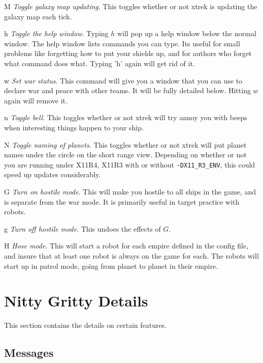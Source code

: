 \begin{list}{}{
	\renewcommand{\makelabel}[1]{{\tt #1 \hfill}}
         \setlength{\leftmargin}{.5in}
         \setlength{\labelwidth}{\leftmargin}
         \setlength{\labelsep}{0in}
}
\item[M]{\em Toggle galaxy map updating}.
This toggles whether or not xtrek is updating the galaxy map each tick.

\item[h]{\em Toggle the help window}.
Typing $h$ will pop up a help window below the normal window.  The help
window lists commands you can type.  Its useful for small problems
like forgetting how to put your shields up, and for authors who forget
what command does what.  Typing 'h' again will get rid of it.

\item[w]{\em Set war status}.
This command will give you a window that you can use to declare
war and peace with other teams.  It will be fully detailed below.
Hitting $w$ again will remove it.

\item[n]{\em Toggle bell}.
This toggles whether or not xtrek will try annoy you with beeps when
interesting things happen to your ship.

\item[N]{\em Toggle naming of planets}.
This toggles whether or not xtrek will put planet names under the circle
on the short range view. Depending on whether or not you are running
under X11R4, X11R3 with or without \verb|-DX11_R3_ENV|, this could speed
up updates considerably.

\item[G]{\em Turn on hostile mode}.
This will make you hostile to all ships in the game, and is separate from
the war mode. It is primarily useful in target practice with robots.

\item[g]{\em Turn off hostile mode}.
This undoes the effects of $G$.

\item [H]{\em Hose mode}.
This will start a robot for each empire defined in the config file, and insure
that at least one robot is always on the game for each. The robots will start
up in patrol mode, going from planet to planet in their empire.
\end{list}

\section{Nitty Gritty Details}

This section contains the details on certain features.

\subsection{Messages}

